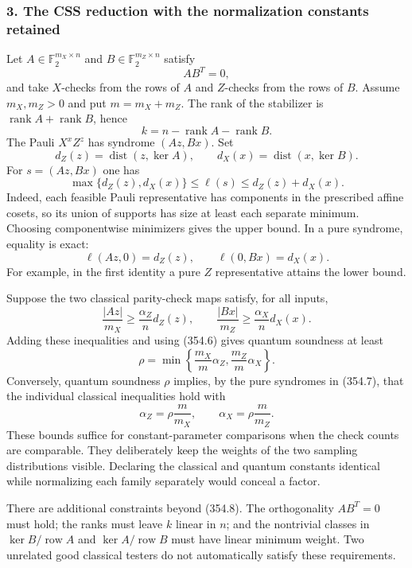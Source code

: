 \documentclass[11pt]{article}
\begin{document}
\subsubsection{3. The CSS reduction with the normalization constants retained}
Let $A\in\mathbb F_2^{m_X\times n}$ and $B\in\mathbb F_2^{m_Z\times n}$ satisfy
\[
 AB^T=0,
\]
and take $X$-checks from the rows of $A$ and $Z$-checks from the rows of $B$. Assume $m_X,m_Z>0$ and put $m=m_X+m_Z$. The rank of the stabilizer is $\operatorname{rank}A+\operatorname{rank}B$, hence
\[
 k=n-\operatorname{rank}A-\operatorname{rank}B.
 \tag{354.5}
\]
The Pauli $X^xZ^z$ has syndrome $(Az,Bx)$. Set
\[
 d_Z(z)=\operatorname{dist}(z,\ker A),\qquad
 d_X(x)=\operatorname{dist}(x,\ker B).
\]
For $s=(Az,Bx)$ one has
\[
 \max\{d_Z(z),d_X(x)\}\le\ell(s)
                           \le d_Z(z)+d_X(x).
 \tag{354.6}
\]
Indeed, each feasible Pauli representative has components in the prescribed affine cosets, so its union of supports has size at least each separate minimum. Choosing componentwise minimizers gives the upper bound. In a pure syndrome, equality is exact:
\[
 \ell(Az,0)=d_Z(z),\qquad \ell(0,Bx)=d_X(x).
 \tag{354.7}
\]
For example, in the first identity a pure $Z$ representative attains the lower bound.

Suppose the two classical parity-check maps satisfy, for all inputs,
\[
 \frac{|Az|}{m_X}\ge\frac{\alpha_Z}{n}d_Z(z),
 \qquad
 \frac{|Bx|}{m_Z}\ge\frac{\alpha_X}{n}d_X(x).
 \tag{354.8}
\]
Adding these inequalities and using (354.6) gives quantum soundness at least
\[
 \rho=\min\left\{\frac{m_X}{m}\alpha_Z,
                         \frac{m_Z}{m}\alpha_X\right\}.
 \tag{354.9}
\]
Conversely, quantum soundness $\rho$ implies, by the pure syndromes in (354.7), that the individual classical inequalities hold with
\[
 \alpha_Z=\rho\frac m{m_X},\qquad
 \alpha_X=\rho\frac m{m_Z}.
 \tag{354.10}
\]
These bounds suffice for constant-parameter comparisons when the check counts are comparable. They deliberately keep the weights of the two sampling distributions visible. Declaring the classical and quantum constants identical while normalizing each family separately would conceal a factor.

There are additional constraints beyond (354.8). The orthogonality $AB^T=0$ must hold; the ranks must leave $k$ linear in $n$; and the nontrivial classes in $\ker B/\operatorname{row}A$ and $\ker A/\operatorname{row}B$ must have linear minimum weight. Two unrelated good classical testers do not automatically satisfy these requirements.
\end{document}
